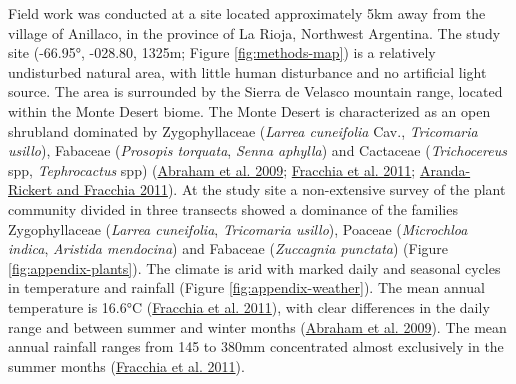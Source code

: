 \documentclass[english,msc,numbers,hidelinks]{coppe}
\begin{document}
  Field work was conducted at a site located approximately 5km away from the village of Anillaco, in the province of La Rioja, Northwest Argentina. The study site (-66.95°, -028.80, 1325m; Figure \ref{fig:methods-map}) is a relatively undisturbed natural area, with little human disturbance and no artificial light source. The area is surrounded by the Sierra de Velasco mountain range, located within the Monte Desert biome. The Monte Desert is characterized as an open shrubland dominated by Zygophyllaceae (\emph{Larrea cuneifolia} Cav., \emph{Tricomaria usillo}), Fabaceae (\emph{Prosopis torquata}, \emph{Senna aphylla}) and Cactaceae (\emph{Trichocereus} spp, \emph{Tephrocactus} spp) (\protect\hyperlink{ref-abraham2009}{Abraham et al. 2009}; \protect\hyperlink{ref-fracchia2011}{Fracchia et al. 2011}; \protect\hyperlink{ref-aranda-rickert2011a}{Aranda-Rickert and Fracchia 2011}). At the study site a non-extensive survey of the plant community divided in three transects showed a dominance of the families Zygophyllaceae (\emph{Larrea cuneifolia}, \emph{Tricomaria usillo}), Poaceae (\emph{Microchloa indica}, \emph{Aristida mendocina}) and Fabaceae (\emph{Zuccagnia punctata}) (Figure \ref{fig:appendix-plants}). The climate is arid with marked daily and seasonal cycles in temperature and rainfall (Figure \ref{fig:appendix-weather}). The mean annual temperature is 16.6°C (\protect\hyperlink{ref-fracchia2011}{Fracchia et al. 2011}), with clear differences in the daily range and between summer and winter months (\protect\hyperlink{ref-abraham2009}{Abraham et al. 2009}). The mean annual rainfall ranges from 145 to 380mm concentrated almost exclusively in the summer months (\protect\hyperlink{ref-fracchia2011}{Fracchia et al. 2011}).
\end{document}
